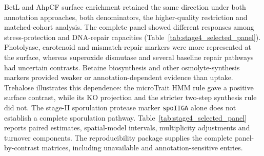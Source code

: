 {BetL and AhpCF surface enrichment retained the same direction under both annotation approaches, both denominators, the higher-quality restriction and matched-cohort analysis. The complete panel showed different responses among stress-protection and DNA-repair capacities (Table~\ref{tab:stage4_selected_panel}). Photolyase, carotenoid and mismatch-repair markers were more represented at the surface, whereas superoxide dismutase and several baseline repair pathways had uncertain contrasts. Betaine biosynthesis and other osmolyte-synthesis markers provided weaker or annotation-dependent evidence than uptake. Trehalose illustrates this dependence: the microTrait HMM rule gave a positive surface contrast, while its KO projection and the stricter two-step synthesis rule did not. The stage-II sporulation protease marker \texttt{spoIIGA} alone does not establish a complete sporulation pathway. Table~\ref{tab:stage4_selected_panel} reports paired estimates, spatial-model intervals, multiplicity adjustments and turnover components. The reproducibility package supplies the complete panel-by-contrast matrices, including unavailable and annotation-sensitive entries.
\par}


